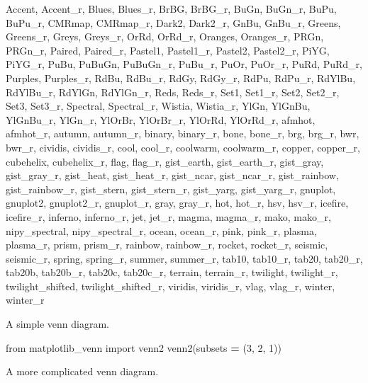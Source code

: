 \documentclass[]{book}
\newenvironment{Shaded}{\begin{snugshade}}{\end{snugshade}}
\newcommand{\DecValTok}[1]{\textcolor[rgb]{0.00,0.00,0.81}{#1}}
\newcommand{\ImportTok}[1]{#1}
\newcommand{\OperatorTok}[1]{\textcolor[rgb]{0.81,0.36,0.00}{\textbf{#1}}}
\newcommand{\NormalTok}[1]{#1}
\begin{document}
\begin{Shaded}
\begin{Highlighting}[]
\NormalTok{Accent, Accent_r, Blues, Blues_r, BrBG, BrBG_r, BuGn, BuGn_r, BuPu, BuPu_r, CMRmap, CMRmap_r, Dark2, Dark2_r, GnBu, GnBu_r, Greens, Greens_r, Greys, Greys_r, OrRd, OrRd_r, Oranges, Oranges_r, PRGn, PRGn_r, Paired, Paired_r, Pastel1, Pastel1_r, Pastel2, Pastel2_r, PiYG, PiYG_r, PuBu, PuBuGn, PuBuGn_r, PuBu_r, PuOr, PuOr_r, PuRd, PuRd_r, Purples, Purples_r, RdBu, RdBu_r, RdGy, RdGy_r, RdPu, RdPu_r, RdYlBu, RdYlBu_r, RdYlGn, RdYlGn_r, Reds, Reds_r, Set1,}
\NormalTok{Set1_r, Set2, Set2_r, Set3, Set3_r, Spectral, Spectral_r, Wistia, Wistia_r, YlGn, YlGnBu, YlGnBu_r, YlGn_r, YlOrBr, YlOrBr_r, YlOrRd, YlOrRd_r, afmhot, afmhot_r, autumn, autumn_r, binary, binary_r, bone, bone_r, brg, brg_r, bwr, bwr_r, cividis, cividis_r, cool, cool_r, coolwarm, coolwarm_r, copper, copper_r, cubehelix, cubehelix_r, flag, flag_r, gist_earth, gist_earth_r, gist_gray, gist_gray_r, gist_heat, gist_heat_r, gist_ncar, gist_ncar_r, gist_rainbow, gist_rainbow_r,}
\NormalTok{gist_stern, gist_stern_r, gist_yarg, gist_yarg_r, gnuplot, gnuplot2, gnuplot2_r, gnuplot_r, gray, gray_r, hot, hot_r, hsv, hsv_r, icefire, icefire_r, inferno, inferno_r, jet, jet_r, magma, magma_r, mako, mako_r, nipy_spectral, nipy_spectral_r, ocean, ocean_r, pink, pink_r, plasma, plasma_r, prism, prism_r, rainbow, rainbow_r, rocket, rocket_r, seismic, seismic_r, spring, spring_r, summer, summer_r, tab10, tab10_r, tab20, tab20_r, tab20b, tab20b_r, tab20c, tab20c_r, terrain, terrain_r,}
\NormalTok{twilight, twilight_r, twilight_shifted, twilight_shifted_r, viridis, viridis_r, vlag, vlag_r, winter, winter_r}
\end{Highlighting}
\end{Shaded}

A simple venn diagram.

\begin{Shaded}
\begin{Highlighting}[]
\ImportTok{from}\NormalTok{ matplotlib_venn }\ImportTok{import}\NormalTok{ venn2}
\NormalTok{venn2(subsets }\OperatorTok{=}\NormalTok{ (}\DecValTok{3}\NormalTok{, }\DecValTok{2}\NormalTok{, }\DecValTok{1}\NormalTok{))}
\end{Highlighting}
\end{Shaded}

A more complicated venn diagram.
\end{document}
